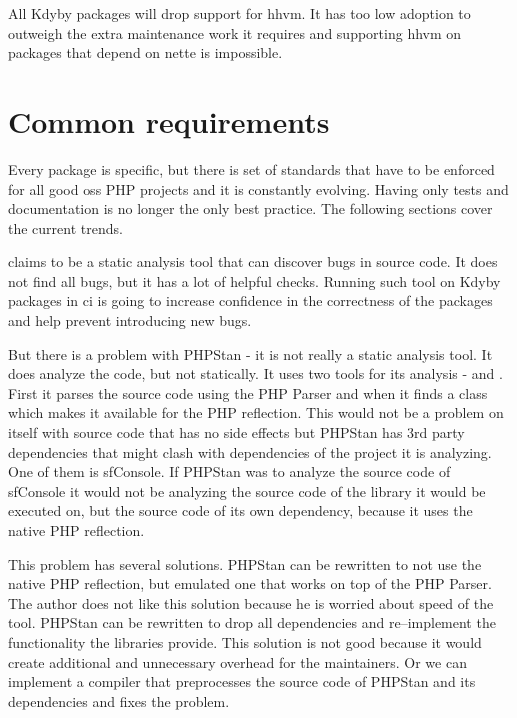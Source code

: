 All Kdyby packages will drop support for \gls{hhvm}. It has too low adoption to outweigh the extra maintenance work it requires and supporting \gls{hhvm} on packages that depend on \gls{nette} is impossible.

\section{Common requirements} \label{sec:roadmap:common}

Every package is specific, but there is set of standards that have to be enforced for all good \gls{oss} PHP projects and it is constantly evolving. Having only tests and documentation is no longer the only best practice. The following sections cover the current trends.


 claims to be a static analysis tool that can discover bugs in source code. It does not find all bugs, but it has a lot of helpful checks. Running such tool on Kdyby packages in \gls{ci} is going to increase confidence in the correctness of the packages and help prevent introducing new bugs.

But there is a problem with PHPStan - it is not really a static analysis tool. It does analyze the code, but not statically. It uses two tools for its analysis -  and . First it parses the source code using the PHP Parser and when it finds a class  which makes it available for the PHP reflection. This would not be a problem on itself with source code that has no side effects but PHPStan has 3rd party dependencies that might clash with dependencies of the project it is analyzing. One of them is \gls{sfConsole}. If PHPStan was to analyze the source code of \gls{sfConsole} it would not be analyzing the source code of the library it would be executed on, but the source code of its own dependency, because it uses the native PHP reflection.

This problem has several solutions. PHPStan can be rewritten to not use the native PHP reflection, but emulated one that works on top of the PHP Parser. The author does not like this solution because he is worried about speed of the tool. PHPStan can be rewritten to drop all dependencies and re--implement the functionality the libraries provide. This solution is not good because it would create additional and unnecessary overhead for the maintainers. Or we can implement a compiler that preprocesses the source code of PHPStan and its dependencies and fixes the problem.


